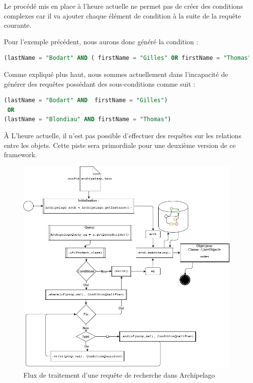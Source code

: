 \documentclass[a4paper,fleqn,12pt,oneside]{report}
\begin{document}
Le procédé mis en place à l'heure actuelle ne permet pas de créer des conditions complexes car il va ajouter chaque élément de condition à la suite de la requête courante. 

Pour l'exemple précédent, nous aurons donc généré la condition : 

\begin{lstlisting}[language=SQL]
(lastName = "Bodart" AND ( firstName = "Gilles" OR firstName = "Thomas"))
\end{lstlisting}

Comme expliqué plus haut, nous sommes actuellement dans l'incapacité de générer des requêtes possédant des sous-conditions comme suit :

\begin{lstlisting}[language=SQL]
(lastName = "Bodart" AND  firstName = "Gilles") 
 OR 
(lastName = "Blondiau" AND firstName = "Thomas")
\end{lstlisting}
\label{badCondition}
\`A L'heure actuelle, il n'est pas possible d'effectuer des requêtes sur les relations entre les objets. Cette piste sera primordiale pour une deuxième version de ce framework.
\newpage

\begin{figure}[!ht]
\centering
\includegraphics[scale=0.6]{figures/query.png}
\caption{Flux de traitement d'une requête de recherche dans Archipelago}
\label{fig:Query}
\end{figure}
\end{document}

